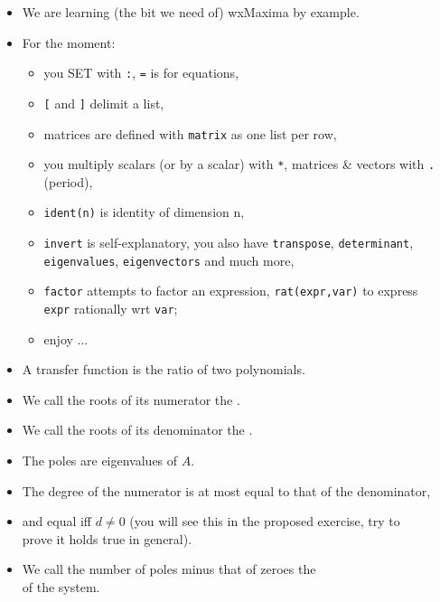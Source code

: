 \begin{frame}
\framesubtitleTC{}
\myPause
 \begin{itemize}[<+-| alert@+>]
 \item We are learning (the bit we need of) wxMaxima by example.
 \item For the moment:
       \begin{itemize}[<+-| alert@+>]
       \item you SET with \texttt{:}, \texttt{=} is for equations,
       \item \texttt{[} and \texttt{]} delimit a list,
       \item matrices are defined with \texttt{matrix} as one list per row,
       \item you multiply scalars (or by a scalar) with \texttt{*}, matrices \& vectors with \texttt{.} (period), 
       \item \texttt{ident(n)} is identity of dimension n,
       \item \texttt{invert} is self-explanatory, you also have \texttt{transpose}, \texttt{determinant},\\
             \texttt{eigenvalues}, \texttt{eigenvectors} and much more,
       \item \texttt{factor} attempts to factor an expression, \texttt{rat(expr,var)} to express\\
             \texttt{expr} rationally wrt \texttt{var};
       \item enjoy \smiley...
       \end{itemize}
 \end{itemize}
\end{frame}

\begin{frame}
\myPause
 \begin{itemize}[<+-| alert@+>]
 \item A transfer function is the ratio of two polynomials.
 \item We call the roots of its numerator the .
 \item We call the roots of its denominator the . 
 \item The poles are eigenvalues of $A$.
 \item The degree of the numerator is at most equal to that of the denominator,
 \item and equal iff $d \neq 0$ (you will see this in the proposed exercise, try to\\
       prove it holds true in general).
 \item We call the number of poles minus that of zeroes the \\
       of the system.
 \end{itemize}
\end{frame}

